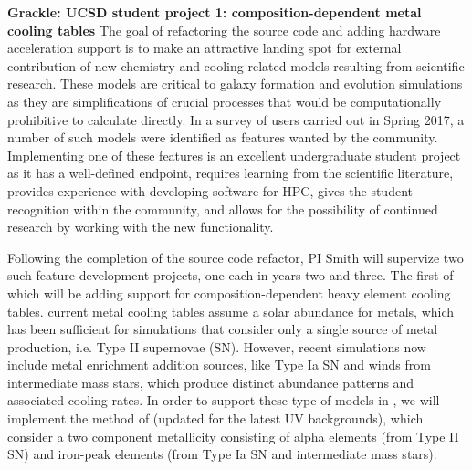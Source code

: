 \noindent \textbf{Grackle: UCSD student project 1:
  composition-dependent metal cooling tables} The goal of refactoring
the \grackle{} source code and adding hardware acceleration support is
to make \grackle{} an attractive landing spot for external
contribution of new chemistry and cooling-related models resulting
from scientific research.
These models are critical to galaxy formation and evolution
simulations as they are simplifications of crucial processes that
would be computationally prohibitive to calculate directly.  
In a survey of \grackle{} users carried out in Spring 2017, a number
of such models were identified as features wanted by the community.
Implementing one of these features is an excellent undergraduate
student project as it has a well-defined endpoint, requires learning
from the scientific literature, provides experience with developing
software for HPC, gives the student recognition within the community,
and allows for the possibility of continued research by working with
the new functionality.

Following the completion of the source code refactor, PI Smith will
supervize two such feature development projects, one each in years two
and three.  The first of which will be adding support for
composition-dependent heavy element cooling tables.  
current metal cooling tables assume a solar abundance for metals,
which has been sufficient for simulations that consider only a single
source of metal production, i.e. Type II supernovae (SN). However, recent
simulations \citep[e.g.,][]{2014MNRAS.444.1518V, 2015MNRAS.446..521S}
now include metal enrichment addition sources, like Type Ia SN
and winds from intermediate mass stars, which produce distinct abundance
patterns and associated cooling rates.  In order to support these type
of models in \grackle{}, we will implement the method of
\citet{2013MNRAS.433.3005D} (updated for the latest UV backgrounds),
which consider a two component metallicity consisting of alpha
elements (from Type II SN) and iron-peak elements (from Type Ia SN and
intermediate mass stars).

